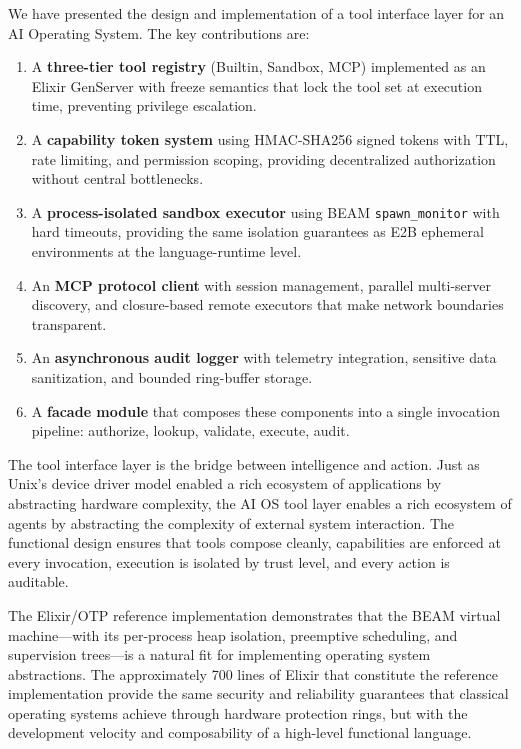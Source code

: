 \documentclass[12pt,a4paper]{article}
\theoremstyle{plain}
\theoremstyle{definition}
\begin{document}
We have presented the design and implementation of a tool interface layer for an AI Operating System. The key contributions are:

\begin{enumerate}[leftmargin=2em]
\item A \textbf{three-tier tool registry} (Builtin, Sandbox, MCP) implemented as an Elixir GenServer with freeze semantics that lock the tool set at execution time, preventing privilege escalation.

\item A \textbf{capability token system} using HMAC-SHA256 signed tokens with TTL, rate limiting, and permission scoping, providing decentralized authorization without central bottlenecks.

\item A \textbf{process-isolated sandbox executor} using BEAM \texttt{spawn\_monitor} with hard timeouts, providing the same isolation guarantees as E2B ephemeral environments at the language-runtime level.

\item An \textbf{MCP protocol client} with session management, parallel multi-server discovery, and closure-based remote executors that make network boundaries transparent.

\item An \textbf{asynchronous audit logger} with telemetry integration, sensitive data sanitization, and bounded ring-buffer storage.

\item A \textbf{facade module} that composes these components into a single invocation pipeline: authorize, lookup, validate, execute, audit.
\end{enumerate}

The tool interface layer is the bridge between intelligence and action. Just as Unix's device driver model enabled a rich ecosystem of applications by abstracting hardware complexity, the AI OS tool layer enables a rich ecosystem of agents by abstracting the complexity of external system interaction. The functional design ensures that tools compose cleanly, capabilities are enforced at every invocation, execution is isolated by trust level, and every action is auditable.

The Elixir/OTP reference implementation demonstrates that the BEAM virtual machine---with its per-process heap isolation, preemptive scheduling, and supervision trees---is a natural fit for implementing operating system abstractions. The approximately 700 lines of Elixir that constitute the reference implementation provide the same security and reliability guarantees that classical operating systems achieve through hardware protection rings, but with the development velocity and composability of a high-level functional language.
\end{document}

